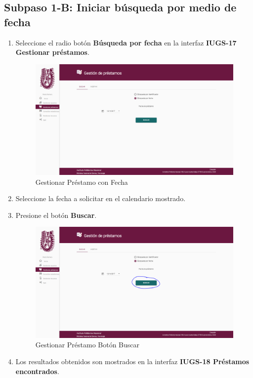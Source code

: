 \subsection{Subpaso 1-B: Iniciar búsqueda por medio de fecha}
\begin{enumerate}
	\item Seleccione el radio botón \textbf{Búsqueda por fecha} en la interfaz
		\textbf{IUGS-17 Gestionar préstamos}.
		\begin{figure}[hbtp]
	\includegraphics[scale=0.3]{images/Interfaz/IUGS07_gestionarPrestamoFecha.PNG}
	\caption{Gestionar Préstamo con Fecha}
	\end{figure}
	\item Seleccione la fecha a solicitar en el calendario mostrado.
	\item Presione el botón \textbf{Buscar}.
	\begin{figure}[hbtp]
	\includegraphics[scale=0.3]{images/Interfaz/IUGS07_gestionarPrestamoBuscar.PNG}
	\caption{Gestionar Préstamo Botón Buscar}
	\end{figure}
	\item Los resultados obtenidos son mostrados en la interfaz \textbf{IUGS-18 Préstamos encontrados}.
	\begin{figure}[hbtp]


\end{figure}
\end{enumerate}
